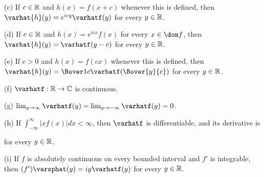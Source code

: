 (c) If $c\in\Bbb R$ and $h(x)=f(x+c)$ whenever this is
defined, then $\varhat{h}(y)=e^{icy}\varhatf(y)$ for every $y\in\Bbb R$.

(d) If $c\in\Bbb R$ and $h(x)=e^{icx}f(x)$ for every
$x\in\dom f$, then $\varhat{h}(y)=\varhatf(y-c)$ for every
$y\in\Bbb R$.

(e) If $c>0$ and $h(x)=f(cx)$ whenever this is defined,
then $\varhat{h}(y)=\Bover1c\varhatf(\Bover{y}{c})$
for every $y\in\Bbb R$.

(f) $\varhatf:\Bbb R\to\Bbb C$ is continuous.

(g) $\lim_{y\to\infty}\varhatf(y)=\lim_{y\to-\infty}\varhatf(y)=0$.

(h) If $\int_{-\infty}^{\infty}|xf(x)|dx<\infty$, then $\varhatf$ is
differentiable, and its derivative is


\noindent for every $y\in\Bbb R$.

(i) If $f$ is absolutely continuous on every bounded interval and $f'$
is integrable, then $(f')\varsphat(y)=iy\varhatf(y)$ for every $y\in\Bbb
R$.

